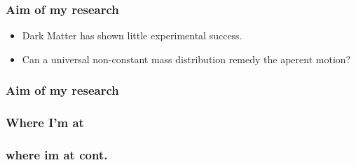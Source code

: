 \documentclass[18pt]{beamer}
\begin{document}
\begin{frame}
    \frametitle{Aim of my research}
    \begin{itemize}
        \item Dark Matter has shown little experimental success.
        \item Can a universal non-constant mass distribution remedy the aperent motion?
    \end{itemize}

\end{frame}







\begin{frame}
    \frametitle{Aim of my research}
    \begin{figure}[h]
        \centering
    \end{figure}
\end{frame}








\begin{frame}
    \frametitle{Where I'm at}
    \begin{itemize}

    \end{itemize}
\end{frame}










\begin{frame}
    \frametitle{where im at cont.}
\begin{itemize}

\end{itemize}
\end{frame}
\end{document}

